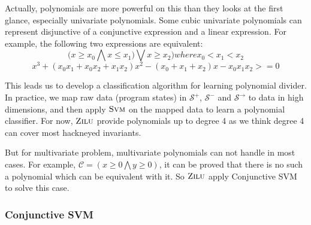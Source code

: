 Actually, polynomials are more powerful on this than they looks at the first glance, especially univariate polynomials. 
Some cubic univariate polynomials can represent disjunctive of a conjunctive expression and a linear expression.
For example, the following two expressions are equivalent:
$$\big(x \ge x_0 \bigwedge x \le x_1) \bigvee x \ge x_2\big)  where x_0 < x_1 < x_2$$
$$x^3 + (x_0x_1 + x_0x_2 + x_1x_2)x^2 - (x_0 + x_1 + x_2)x - x_0x_1x_2 >= 0$$ 


This leads us to develop a classification algorithm for learning polynomial divider.
In practice, we map raw data (program states) in $\mathcal{S}^+$, $\mathcal{S}^-$ and $\mathcal{S}^\rightarrow$ to data in high dimensions, 
and then apply $\textsc{Svm}$ on the mapped data to learn a polynomial classifier. 
For now, $\textsc{Zilu}$ provide polynomials up to degree 4 as we think degree 4 can cover most hackneyed invariants.

But for multivariate problem, multivariate polynomials can not handle in most cases.
For example, $\mathcal{C} = (x \ge 0 \bigwedge y \ge 0)$,
it can be proved that there is no such a polynomial which can be equivalent with it.
So $\textsc{Zilu}$ apply Conjunctive SVM to solve this case.


\subsubsection{Conjunctive SVM}





